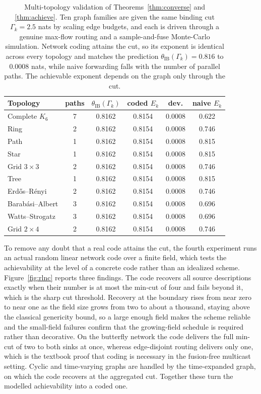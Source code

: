 \documentclass[journal]{IEEEtran}
\theoremstyle{definition}
\theoremstyle{remark}
\newcommand{\Gk}{\Gamma_k}
\begin{document}
\begin{table}[t]
\centering
\caption{Multi-topology validation of Theorems~\ref{thm:converse} and \ref{thm:achieve}. Ten graph families are
given the same binding cut $\Gk=2.5$ nats by scaling edge budgets, and each is driven through a genuine max-flow
routing and a sample-and-fuse Monte-Carlo simulation. Network coding attains the cut, so its exponent is
identical across every topology and matches the prediction $\theta_{\mathrm{IB}}(\Gk)=0.816$ to $0.0008$ nats,
while naive forwarding falls with the number of parallel paths. The achievable exponent depends on the graph only
through the cut.}
\label{tab:topology}
\renewcommand{\arraystretch}{1.12}
\footnotesize
\setlength{\tabcolsep}{4.2pt}
\begin{tabular}{@{}lccccc@{}}
\toprule
Topology & paths & $\theta_{\mathrm{IB}}(\Gk)$ & coded $E_k$ & dev. & naive $E_k$ \\
\midrule
Complete $K_6$ & 7 & 0.8162 & 0.8154 & 0.0008 & 0.622 \\
Ring & 2 & 0.8162 & 0.8154 & 0.0008 & 0.746 \\
Path & 1 & 0.8162 & 0.8154 & 0.0008 & 0.815 \\
Star & 1 & 0.8162 & 0.8154 & 0.0008 & 0.815 \\
Grid $3\times3$ & 2 & 0.8162 & 0.8154 & 0.0008 & 0.746 \\
Tree & 1 & 0.8162 & 0.8154 & 0.0008 & 0.815 \\
Erd\H{o}s--R\'enyi & 2 & 0.8162 & 0.8154 & 0.0008 & 0.746 \\
Barab\'asi--Albert & 3 & 0.8162 & 0.8154 & 0.0008 & 0.696 \\
Watts--Strogatz & 3 & 0.8162 & 0.8154 & 0.0008 & 0.696 \\
Grid $2\times4$ & 2 & 0.8162 & 0.8154 & 0.0008 & 0.746 \\
\bottomrule
\end{tabular}
\end{table}

To remove any doubt that a real code attains the cut, the fourth experiment runs an actual random linear network
code over a finite field, which tests the achievability at the level of a concrete code rather than an idealized
scheme. Figure~\ref{fig:rlnc} reports three findings. The code recovers all source descriptions exactly when their
number is at most the min-cut of four and fails beyond it, which is the sharp cut threshold. Recovery at the
boundary rises from near zero to near one as the field size grows from two to about a thousand, staying above the
classical genericity bound, so a large enough field makes the scheme reliable and the small-field failures confirm
that the growing-field schedule is required rather than decorative. On the butterfly network the code delivers the
full min-cut of two to both sinks at once, whereas edge-disjoint routing delivers only one, which is the textbook
proof that coding is necessary in the fusion-free multicast setting. Cyclic and time-varying graphs are handled by
the time-expanded graph, on which the code recovers at the aggregated cut. Together these turn the modelled
achievability into a coded one.
\end{document}
